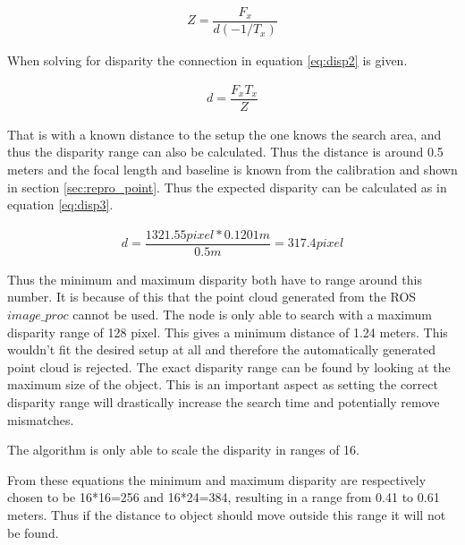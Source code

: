\begin{equation}\label{eq:disp1}
\begin{split}
Z = \dfrac{F_{x}}{ d(-1/T_{x})}
\end{split}
\end{equation} 

When solving for disparity the connection in equation \ref{eq:disp2} is given.

\begin{equation}\label{eq:disp2}
\begin{split}
 d = \dfrac{F_{x}T_{x}}{ Z}
\end{split}
\end{equation} 

That is with a known distance to the setup the one knows the search area, and thus the disparity range can also be calculated. Thus the distance is around 0.5 meters and the focal length and baseline is known from the calibration and shown in section \ref{sec:repro_point}. Thus the expected disparity can be calculated as in equation \ref{eq:disp3}.

\begin{equation}\label{eq:disp3}
\begin{split}
d = \dfrac{1321.55 pixel*0.1201m}{0.5m} = 317.4 pixel
\end{split}
\end{equation}

Thus the minimum and maximum disparity both have to range around this number. It is because of this that the point cloud generated from the ROS $image\_proc$ cannot be used. The node is only able to search with a maximum disparity range of 128 pixel. This gives a minimum distance of 1.24 meters. This wouldn't fit the desired setup at all and therefore the automatically generated point cloud is rejected. The exact disparity range can be found by looking at the maximum size of the object. This is an important aspect as setting the correct disparity range will drastically increase the search time and potentially remove mismatches.

The algorithm is only able to scale the disparity in ranges of 16.

From these equations the minimum and maximum disparity are respectively chosen to be 16*16=256 and                                   16*24=384, resulting in a range from 0.41 to 0.61 meters. Thus if the distance to object should move outside this range it will not be found.